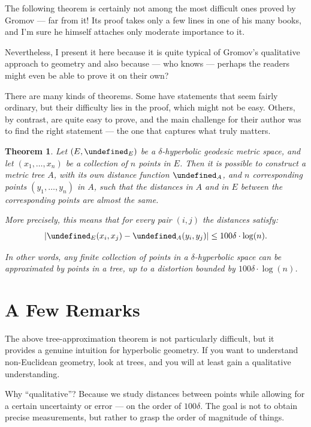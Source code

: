 \documentclass{amsart}
\let\d=\undefined
\DeclareMathOperator{\d}{d}
\newtheorem*{theorem}{Theorem}
\begin{document}
The following theorem is certainly not among the most difficult ones
proved by Gromov --- far from it! Its proof takes only a few lines in
one of his many books, and I’m sure he himself attaches only moderate
importance to it. 

Nevertheless, I present it here because it is quite typical of
Gromov’s qualitative approach to geometry and also because --- who
knows --- perhaps the readers might even be able to prove it on their
own?

There are many kinds of theorems. Some have statements that seem
fairly ordinary, but their difficulty lies in the proof, which
might not be easy. Others, by contrast, are quite easy to prove, and
the main challenge for their author was to find the right statement
--- the one that captures what truly matters.

\begin{theorem}
  Let $(E,\d_{E})$ be a $\delta$-hyperbolic geodesic metric space,
  and let $(x_{1},\dots,x_{n})$ be a collection of $n$ points in $E$. Then
  it is possible to construct a metric tree $A$, with its own distance
  function $\d_{A}$, and $n$ corresponding points $(y_{1},\dots,y_{n})$ in $A$,
  such that the distances in $A$ and in $E$ between the corresponding
  points are almost the same.

  More precisely, this means that for every pair $(i,j)$ the
  distances satisfy:
  \[
    |\d_{E}(x_{i},x_{j})-\d_{A}(y_{i},y_{j})| \leq 100\delta\cdot\log(n).
  \]

  In other words, any finite collection of points in a $\delta$-hyperbolic
  space can be approximated by points in a tree, up to a distortion
  bounded by $100\delta\cdot\log(n)$.
\end{theorem}

\section{A Few Remarks}

The above tree-approximation theorem is not particularly difficult, but it
provides a genuine intuition for hyperbolic geometry. If you want to
understand non-Euclidean geometry, look at trees, and you will at
least gain a qualitative understanding.

Why ``qualitative''? Because we study distances between points while
allowing for a certain uncertainty or error --- on the order
of $100\delta$. The goal is not to obtain precise measurements, but
rather to grasp the order of magnitude of things.
\end{document}
